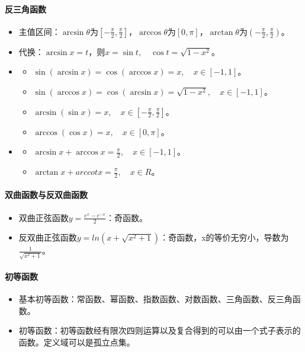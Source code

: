 \documentclass[
12pt, %
a4paper, 
oneside, %
]{scrartcl}
\begin{document}
\paragraph{反三角函数}
\begin{itemize}
\item 主值区间：$ \arcsin\theta $为$ [-\frac{\pi}{2}, \frac{\pi}{2}] $，$ \arccos\theta $为$ [0, \pi] $，$ \arctan\theta $为$ (-\frac{\pi}{2}, \frac{\pi}{2}) $。
\item 代换：$ \arcsin x = t $，则$ x = \sin t, \quad \cos t = \sqrt{1 - x^2} $。
\item 
\begin{itemize}
\item $ \sin(\arcsin x) = \cos(\arccos x) = x, \quad x \in [-1, 1] $。
\item $ \sin(\arccos x) = \cos(\arcsin x) = \sqrt{1 - x^2}, \quad x \in [-1, 1] $。
\item $ \arcsin(\sin x) =x, \quad x \in [-\frac{\pi}{2}, \frac{\pi}{2}] $。
\item $ \arccos(\cos x) =x, \quad x \in [0, \pi] $。
\end{itemize}
\item 
\begin{itemize}
\item $ \arcsin x + \arccos x = \frac{\pi}{2}, \quad x \in [-1, 1] $。
\item $ \arctan x + arccot x = \frac{\pi}{2}, \quad x \in R $。
\end{itemize}
\end{itemize}
\paragraph{双曲函数与反双曲函数}
\begin{itemize}
\item 双曲正弦函数$ y = \frac{e^x - e^{-x}}{2} $：奇函数。
\item 反双曲正弦函数$ y = ln(x + \sqrt{x^2 + 1}) $：奇函数，x的等价无穷小，导数为$ \frac{1}{\sqrt{x^2 + 1}} $。
\end{itemize}
\paragraph{初等函数}
\begin{itemize}
\item 基本初等函数：常函数、幂函数、指数函数、对数函数、三角函数、反三角函数。
\item 初等函数：初等函数经有限次四则运算以及复合得到的可以由一个式子表示的函数。定义域可以是孤立点集。
\end{itemize}
\end{document}
